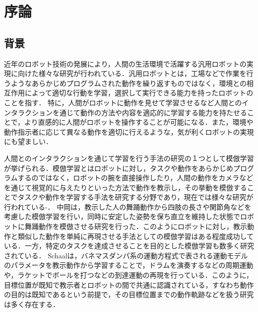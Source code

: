 ﻿%
\chapter{序論}

\section{背景}

近年のロボット技術の発展により，人間の生活環境で活躍する汎用ロボットの実現に向けた様々な研究が行われている．汎用ロボットとは，工場などで作業を行うようなあらかじめプログラムされた動作を繰り返すものではなく，環境との相互作用によって適切な行動を学習，選択して実行できる能力を持ったロボットのことを指す．
特に，人間がロボットに動作を見せて学習させるなど人間とのインタラクションを通じて動作の方法や内容を適応的に学習する能力を持たせることで，より直感的に人間がロボットを操作することが可能になる．また，環境や動作指示者に応じて異なる動作を適切に行えるような，気が利くロボットの実現にも望ましい．

人間とのインタラクションを通じて学習を行う手法の研究の１つとして模倣学習が挙げられる．模倣学習とはロボットに対し，タスクや動作をあらかじめプログラムするのではなく，ロボットの腕を直接操作したり，人間の動作をカメラなどを通じて視覚的に与えたりといった方法で動作を教示し，その挙動を模倣することでタスクや動作を学習する手法を研究する分野であり，現在では様々な研究が行われている\cite{imitation1}-\cite{imitation4}．
中岡\cite{nakaoka}は，教示した人の舞踊動作から四肢の長さや関節角などを考慮した模倣学習を行い，同時に安定した姿勢を保ち直立を維持した状態でロボットに舞踊動作を模倣させる研究を行った．このようにロボットに対し，教示動作と類似した動作を単純に再現させる手法としての模倣学習はある程度成功している．一方，特定のタスクを達成させることを目的とした模倣学習も数多く研究されている．
Schaal\cite{schaal}は，バネマスダンパ系の運動方程式で表される運動モデルのパラメータを教示動作から学習することで，ドラムを演奏するなどの周期運動や，ラケットでボールを打つなどの到達運動の再現を行っている．このように，目標位置が既知で教示者とロボットの間で共通に認識されている，すなわち動作の目的は既知であるという前提で，その目標位置までの動作軌跡などを扱う研究は多く存在する．

